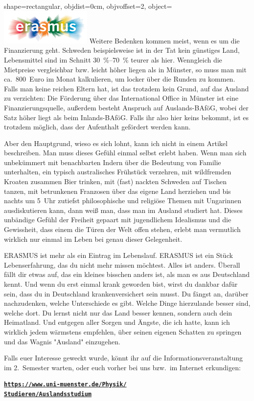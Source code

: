 \begin{pullquote}{shape=rectangular, objdist=0cm, objvoffset=2,
object={\includegraphics[width=4.5cm]{res/erasmus.jpg}}}
Weitere Bedenken kommen meist, wenn es um die Finanzierung geht. Schweden beispielsweise ist in der Tat kein günstiges Land, Lebensmittel sind im Schnitt \SIrange{30}{70}{\percent} teurer als hier. Wenngleich die Mietpreise vergleichbar bzw. leicht höher liegen als in Münster, so muss man mit ca.~800~Euro im Monat kalkulieren, um locker über die Runden zu kommen. Falls man keine reichen Eltern hat, ist das trotzdem kein Grund, auf das Ausland zu verzichten: Die Förderung über das International Office in Münster ist eine Finanzierungsquelle, außerdem besteht Anspruch auf Auslands-BAföG, wobei der Satz höher liegt als beim Inlands-BAföG. Falls ihr also hier keins bekommt, ist es trotzdem möglich, dass der Aufenthalt gefördert werden kann.\pullquotenl

Aber den Hauptgrund, wieso es sich lohnt, kann ich nicht in einem Artikel beschreiben. Man muss dieses Gefühl einmal selbst erlebt haben. Wenn man sich unbekümmert mit benachbarten Indern über die Bedeutung von Familie unterhalten, ein typisch australisches Frühstück verzehren, mit wildfremden Kroaten zusammen Bier trinken, mit (fast) nackten Schweden auf Tischen tanzen, mit betrunkenen Franzosen über das eigene Land herziehen und bis nachts um 5~Uhr zutiefst philosophische und religiöse Themen mit Ungarinnen ausdiskutieren kann, dann weiß man, dass man im Ausland studiert hat. Dieses unbändige Gefühl der Freiheit gepaart mit jugendlichem Idealismus und die Gewissheit, dass einem die Türen der Welt offen stehen, erlebt man vermutlich wirklich nur einmal im Leben bei genau dieser Gelegenheit.\pullquotenl

ERASMUS ist mehr als ein Eintrag im Lebenslauf. ERASMUS ist ein Stück Lebenserfahrung, das du nicht mehr missen möchtest. Alles ist anders. Überall fällt dir etwas auf, das ein kleines bisschen anders ist, als man es aus Deutschland kennt. Und wenn du erst einmal krank geworden bist, wirst du dankbar dafür sein, dass du in Deutschland krankenversichert sein musst. Du fängst an, darüber nachzudenken, welche Unterschiede es gibt. Welche Dinge hierzulande besser sind, welche dort. Du lernst nicht nur das Land besser kennen, sondern auch dein Heimatland. Und entgegen aller Sorgen und Ängste, die ich hatte, kann ich wirklich jedem wärmstens empfehlen, über seinen eigenen Schatten zu springen und das Wagnis "Ausland" einzugehen.\pullquotenl

Falls euer Interesse geweckt wurde, könnt ihr auf die Informationsveranstaltung im 2.~Semester warten, oder euch vorher bei uns bzw.\ im Internet erkundigen:

\href{https://www.uni-muenster.de/Physik/Studieren/Auslandsstudium}{\textbf{\texttt{https://www.uni-muenster.de/Physik/\\Studieren/Auslandsstudium}}}

\end{pullquote}

